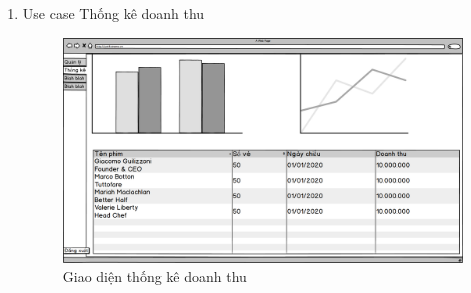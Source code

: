 \documentclass[a4paper, 12pt]{article}
\begin{document}
\begin{enumerate}
        \item Use case Thống kê doanh thu
        \begin{figure}[H]
            \begin{center}
                \includegraphics[scale = 0.25]{Wireframe/Admin/Admin_Thống kê.png}
                \caption{Giao diện thống kê doanh thu}
            \end{center}
        \end{figure}

    \end{enumerate}
\end{document}

